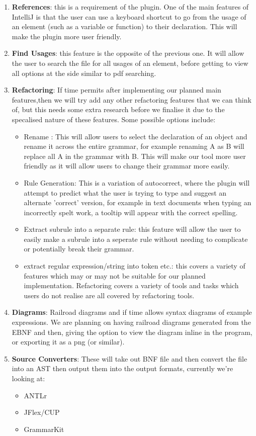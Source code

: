 \documentclass{l3proj}
\begin{document}
\begin{enumerate}
	\item \textbf{References}: this is a requirement of the plugin. One of the main features of IntelliJ is that the user can use a keyboard shortcut to go from the usage of an element (such as a variable or function) to their declaration. This will make the plugin more user friendly.
	\item \textbf{Find Usages}: this feature is the opposite of the previous one. It will allow the user to search the file for all usages of an element, before getting to view all options at the side similar to pdf searching.
	\item \textbf{Refactoring}: If time permits after implementing our planned main features,then we will try add any other refactoring features that we can think of, but this needs some extra research before we finalise it due to the specalised nature of these features. Some possible options include:
	      \begin{itemize}
		    \item Rename : This will allow users to select the declaration of an object and rename it across the entire grammar, for example renaming A as B will replace all A in the grammar with B. This will make our tool more user friendly as it will allow users to change their grammar more easily. 
		    \item Rule Generation: This is a variation of autocorrect, where the plugin will attempt to predict what the user is trying to type and suggest an alternate 'correct' version, for example in text documents when typing an incorrectly spelt work, a tooltip will appear with the correct spelling.
		    \item Extract subrule into a separate rule: this feature will allow the user to easily make a subrule into a seperate rule without needing to complicate or potentially break their grammar. 
		    \item extract regular expression/string into token etc.: this covers a variety of features which may or may not be suitable for our planned implementation. Refactoring covers a variety of tools and tasks which users do not realise are all covered by refactoring tools.
	      \end{itemize}
	\item \textbf{Diagrams}: Railroad diagrams and if time allows syntax diagrams of example expressions. We are planning on having railroad diagrams generated from the EBNF and then, giving the option to view the diagram inline in the program, or exporting it as a png (or similar). 
	\item \textbf{Source Converters}: These will take out BNF file and then convert the file into an AST then output them into the output formats, currently we're looking at:
	      \begin{itemize}
		    \item ANTLr
		    \item JFlex/CUP
		    \item GrammarKit
	      \end{itemize}
	      

\end{enumerate}
\end{document}
